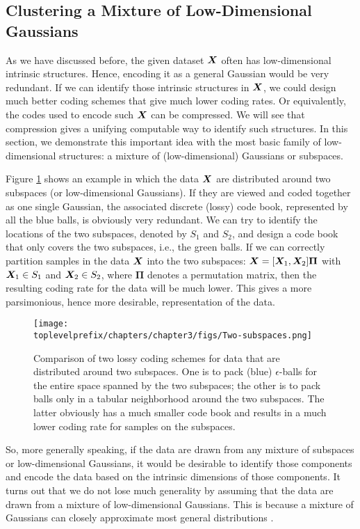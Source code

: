 \documentclass[../../book-main.tex]{subfiles}
\begin{document}
\subsection{Clustering a Mixture of Low-Dimensional Gaussians}
\label{sec:clustering-Gaussians}
As we have discussed before, the given dataset $\bm{X}$ often has low-dimensional intrinsic structures. Hence, encoding it as a general Gaussian would be very redundant. If we can identify those intrinsic structures in $\bm{X}$, we could design much better coding schemes that give much lower coding rates. Or equivalently, the codes used to encode such $\bm{X}$ can be compressed. We will see that compression gives a unifying computable way to identify such structures. In this section, we demonstrate this important idea with the most basic family of low-dimensional structures: a mixture of (low-dimensional) Gaussians or subspaces.

\begin{example}
	Figure \ref{fig:two-subspaces} shows an example in which the data $\bm{X}$ are distributed around two subspaces (or low-dimensional Gaussians). If they are viewed and coded together as one single Gaussian, the associated discrete (lossy) code book, represented by all the blue balls, is obviously very redundant. We can try to identify the locations of the two subspaces, denoted by $S_1$ and $S_2$, and design a code book that only covers the two subspaces, i.e., the green balls. If we can correctly partition samples in the data $\bm{X}$ into the two subspaces: $\bm{X} = [\bm{X}_1, \bm{X}_2]\bm \Pi$ with $\bm{X}_1 \in S_1$ and $\bm{X}_2 \in S_2$, where $\bm \Pi$ denotes a permutation matrix, then the resulting coding rate for the data will be much lower. This gives a more parsimonious, hence more desirable, representation of the data.
\end{example}

\begin{figure}
	\centering
	\texttt{[image: \\toplevelprefix/chapters/chapter3/figs/Two-subspaces.png]}
	\caption{Comparison of two lossy coding schemes for data that are distributed around two subspaces. One is to pack (blue) $\epsilon$-balls for the entire space spanned by the two subspaces; the other is to pack balls only in a tabular neighborhood around the two subspaces. The latter obviously has a much smaller code book and results in a much lower coding rate for samples on the subspaces.}
	\label{fig:two-subspaces}
\end{figure}

So, more generally speaking, if the data are drawn from any mixture of subspaces or low-dimensional Gaussians, it would be desirable to identify those components and encode the data based on the intrinsic dimensions of those components. It turns out that we do not lose much generality by assuming that the data are drawn from a mixture of low-dimensional Gaussians. This is because a mixture of Gaussians can closely approximate most general distributions \cite{borkar2016gaussian}. 
\end{document}
